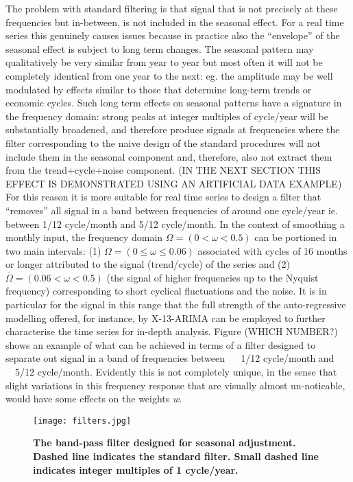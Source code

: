 \documentclass{article}
\begin{document}
The problem with standard filtering is that signal that is not precisely at these frequencies but in-between, is not included in the seasonal effect. For a real time series this genuinely causes issues because in practice also the ``envelope'' of the seasonal effect is subject to long term changes. The seasonal pattern may qualitatively be very similar from year to year but most often it will not be completely identical from one year to the next: eg. the amplitude may be well modulated by effects similar to those that determine long-term trends or economic cycles. Such long term effects on seasonal patterns have a signature in the frequency domain: strong peaks at integer multiples of cycle/year will be substantially broadened, and therefore produce signals at frequencies where the filter corresponding to the naive design of the standard procedures will not include them in the seasonal component and, therefore, also not extract them from the trend+cycle+noise component. (IN THE NEXT SECTION THIS EFFECT IS DEMONSTRATED USING AN ARTIFICIAL DATA EXAMPLE)\\For this reason it is more suitable for real time series to design a filter that ``removes'' all signal in a band between frequencies of around one cycle/year ie. between 1/12 cycle/month and 5/12 cycle/month. In the context of smoothing a monthly input, the frequency domain $\Omega=(0<\omega<0.5)$ can be portioned in two main intervals: (1) $\Omega=(0 \leq \omega \leq 0.06)$ associated with cycles of 16 months or longer attributed to the signal (trend/cycle) of the series and (2) $\bar{\Omega}=(0.06 < \omega < 0.5)$ (the signal of higher frequencies up to the Nyquist frequency) corresponding to short cyclical fluctuations and the noise. It is in particular for the signal in this range that the full strength of the auto-regressive modelling offered, for instance, by X-13-ARIMA can be employed to further characterise the time series for in-depth analysis. Figure (WHICH NUMBER?) shows an example of what can be achieved in terms of a filter designed to separate out signal in a band of frequencies between ~~ 1/12 cycle/month and ~~5/12 cycle/month. Evidently this is not completely unique, in the sense that slight variations in this frequency response that are visually almost un-noticable, would have some effects on the weights \textit{w}.
\begin{figure}[h!]
  \texttt{[image: filters.jpg]}
  \caption{\textbf{\small The band-pass filter designed for seasonal adjustment. Dashed line indicates the standard filter. Small dashed line indicates integer multiples of 1 cycle/year.}}
\end{figure}
\end{document}
